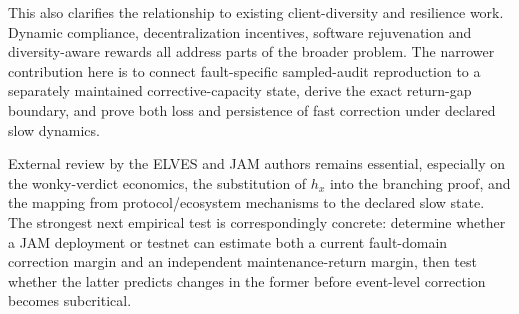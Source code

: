This also clarifies the relationship to existing client-diversity and resilience work. Dynamic compliance, decentralization incentives, software rejuvenation and diversity-aware rewards all address parts of the broader problem. The narrower contribution here is to connect fault-specific sampled-audit reproduction to a separately maintained corrective-capacity state, derive the exact return-gap boundary, and prove both loss and persistence of fast correction under declared slow dynamics.

External review by the ELVES and JAM authors remains essential, especially on the wonky-verdict economics, the substitution of \(h_x\) into the branching proof, and the mapping from protocol/ecosystem mechanisms to the declared slow state. The strongest next empirical test is correspondingly concrete: determine whether a JAM deployment or testnet can estimate both a current fault-domain correction margin and an independent maintenance-return margin, then test whether the latter predicts changes in the former before event-level correction becomes subcritical.
